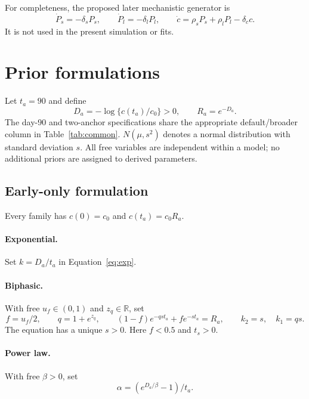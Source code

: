 \documentclass[11pt,a4paper]{article}
\newcommand{\reporttable}[1]{%
  }
\begin{document}
For completeness, the proposed later mechanistic generator is
\begin{equation}
  \dot P_s=-\delta_sP_s,\qquad \dot P_l=-\delta_lP_l,\qquad
  \dot c=\rho_sP_s+\rho_lP_l-\delta_cc.
\end{equation}
It is not used in the present simulation or fits.

\section{Prior formulations}
Let $t_a=90$ and define
\begin{equation}
  D_a=-\log\{c(t_a)/c_0\}>0,\qquad R_a=e^{-D_a}.
\end{equation}
The day-90 and two-anchor specifications share the appropriate
default/broader column in Table~\ref{tab:common}.
$N(\mu,s^2)$ denotes a normal distribution with
standard deviation $s$. All free variables are independent within a model;
no additional priors are assigned to derived parameters.

\begin{table}[H]
\centering\small
\caption{Common priors in the day-90 and two-anchor formulations.}
\label{tab:common}
\reporttable{common-priors}
\end{table}

\subsection{Early-only formulation}
Every family has $c(0)=c_0$ and $c(t_a)=c_0R_a$.

\paragraph{Exponential.} Set $k=D_a/t_a$ in Equation~\eqref{eq:exp}.

\paragraph{Biphasic.} With free $u_f\in(0,1)$ and $z_q\in\mathbb R$, set
\begin{equation}
  f=u_f/2,\qquad q=1+e^{z_q},\qquad
  (1-f)e^{-qst_a}+fe^{-st_a}=R_a,\qquad k_2=s,\quad k_1=qs.
\end{equation}
The equation has a unique $s>0$. Here $f<0.5$ and $t_s>0$.

\paragraph{Power law.} With free $\beta>0$, set
\begin{equation}
  \alpha=(e^{D_a/\beta}-1)/t_a.
\end{equation}
\end{document}
